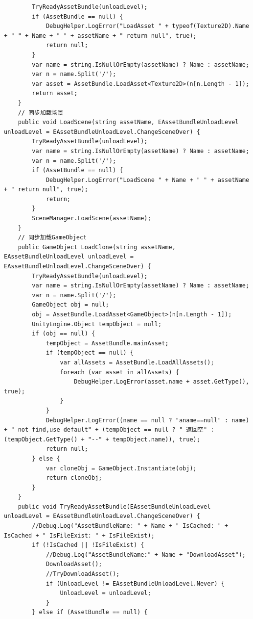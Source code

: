 \documentclass[9pt, b5paper]{article}
\begin{document}
\begin{itemize}
\begin{verbatim}
        TryReadyAssetBundle(unloadLevel);
        if (AssetBundle == null) {
            DebugHelper.LogError("LoadAsset " + typeof(Texture2D).Name + " " + Name + " " + assetName + " return null", true);
            return null;
        }
        var name = string.IsNullOrEmpty(assetName) ? Name : assetName;
        var n = name.Split('/');
        var asset = AssetBundle.LoadAsset<Texture2D>(n[n.Length - 1]);
        return asset;
    }
    // 同步加载场景
    public void LoadScene(string assetName, EAssetBundleUnloadLevel unloadLevel = EAssetBundleUnloadLevel.ChangeSceneOver) {
        TryReadyAssetBundle(unloadLevel);
        var name = string.IsNullOrEmpty(assetName) ? Name : assetName;
        var n = name.Split('/');
        if (AssetBundle == null) {
            DebugHelper.LogError("LoadScene " + Name + " " + assetName + " return null", true);
            return;
        }
        SceneManager.LoadScene(assetName);
    }
    // 同步加载GameObject
    public GameObject LoadClone(string assetName, EAssetBundleUnloadLevel unloadLevel = EAssetBundleUnloadLevel.ChangeSceneOver) {
        TryReadyAssetBundle(unloadLevel);
        var name = string.IsNullOrEmpty(assetName) ? Name : assetName;
        var n = name.Split('/');
        GameObject obj = null;
        obj = AssetBundle.LoadAsset<GameObject>(n[n.Length - 1]);
        UnityEngine.Object tempObject = null;
        if (obj == null) {
            tempObject = AssetBundle.mainAsset;
            if (tempObject == null) {
                var allAssets = AssetBundle.LoadAllAssets();
                foreach (var asset in allAssets) {
                    DebugHelper.LogError(asset.name + asset.GetType(), true);
                }
            }
            DebugHelper.LogError((name == null ? "aname==null" : name) + " not find,use default" + (tempObject == null ? " 返回空" : (tempObject.GetType() + "--" + tempObject.name)), true);
            return null;
        } else {
            var cloneObj = GameObject.Instantiate(obj);
            return cloneObj;
        }
    }
    public void TryReadyAssetBundle(EAssetBundleUnloadLevel unloadLevel = EAssetBundleUnloadLevel.ChangeSceneOver) {
        //Debug.Log("AssetBundleName: " + Name + " IsCached: " + IsCached + " IsFileExist: " + IsFileExist);
        if (!IsCached || !IsFileExist) {
            //Debug.Log("AssetBundleName:" + Name + "DownloadAsset");
            DownloadAsset();
            //TryDownloadAsset();
            if (UnloadLevel != EAssetBundleUnloadLevel.Never) {
                UnloadLevel = unloadLevel;
            }
        } else if (AssetBundle == null) {

\end{verbatim}
\end{itemize}
\end{document}
